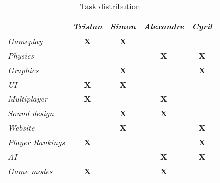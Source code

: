 \begin{landscape}

\begin{table}[]
\centering
\caption{Task distribution}
\label{my-label}
\begin{tabular}{|lcccc|}
\hline
\multicolumn{1}{|c}{\textbf{}} &
\multicolumn{1}{l}{\textit{\textbf{Tristan}}} &
\multicolumn{1}{l}{\textit{\textbf{Simon}}} &
\multicolumn{1}{l}{\textit{\textbf{Alexandre}}} &
\multicolumn{1}{l|}{\textit{\textbf{Cyril}}} \\ \hline
\multicolumn{1}{|l|}{\textit{Gameplay}}         & \textbf{X}    & \textbf{X}    & \textbf{}     & \textbf{}     \\ \hline
\multicolumn{1}{|l|}{\textit{Physics}}          & \textbf{}     & \textbf{}     & \textbf{X}    & \textbf{X}    \\ \hline
\multicolumn{1}{|l|}{\textit{Graphics}}         & \textbf{}     & \textbf{X}    & \textbf{}     & \textbf{X}    \\ \hline
\multicolumn{1}{|l|}{\textit{UI}}               & \textbf{X}    & \textbf{X}    & \textbf{}     & \textbf{}     \\ \hline
\multicolumn{1}{|l|}{\textit{Multiplayer}}      & \textbf{X}    & \textbf{}     & \textbf{X}    & \textbf{}     \\ \hline
\multicolumn{1}{|l|}{\textit{Sound design}}     & \textbf{}     & \textbf{X}    & \textbf{X}    & \textbf{}     \\ \hline
\multicolumn{1}{|l|}{\textit{Website}}          & \textbf{}     & \textbf{X}    & \textbf{}     & \textbf{X}    \\ \hline
\multicolumn{1}{|l|}{\textit{Player Rankings}}  & \textbf{X}    & \textbf{}     & \textbf{}     & \textbf{X}    \\ \hline
\multicolumn{1}{|l|}{\textit{AI}}               & \textbf{}     & \textbf{}     & \textbf{X}    & \textbf{X}    \\ \hline
\multicolumn{1}{|l|}{\textit{Game modes}}       & \textbf{X}    & \textbf{}     & \textbf{X}    & \textbf{}     \\ \hline
\end{tabular}
\end{table}
\end{landscape}

